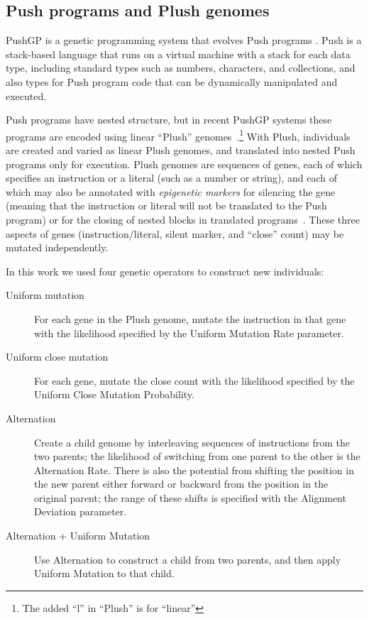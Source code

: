 \subsection{Push programs and Plush genomes}
\label{sec:PushGPBackground}

PushGP is a genetic programming system that evolves Push programs 
\cite{spector2:2001:gecco,spector:2002:GPEM,push3gecco,Helmuth:2015:dissertation}. 
Push is a stack-based language that runs on a virtual machine with a stack for 
each data type, including standard types such as numbers, characters, and 
collections, and also types for Push program code that can be dynamically 
manipulated and executed. 

Push programs have nested structure, but in recent PushGP systems these 
programs are encoded using linear ``Plush'' 
genomes~\cite{helmuthlinear}.\footnote{The added ``l'' in ``Plush'' 
	is for ``linear''}
With Plush, individuals are created and varied as linear Plush genomes, and 
translated into nested Push programs only for execution.
Plush genomes are sequences of genes, each of which specifies an instruction or 
a literal (such as a number or string), and each of which may also be annotated 
with {\it epigenetic markers} for silencing the gene (meaning that the instruction 
or literal will not be translated to the Push program) or for the closing of nested 
blocks in translated programs~\cite{la2015inheritable}. These three aspects of 
genes (instruction/literal, silent marker, and ``close'' count) may be mutated 
independently.

In this work we used four genetic operators to construct new individuals:
\begin{description}
	\item[Uniform mutation] For each gene in the Plush genome, mutate the 
	instruction in that gene with the likelihood specified by the Uniform Mutation 
	Rate parameter.
	\item[Uniform close mutation] For each gene, mutate the close count
	with the likelihood specified by the Uniform Close Mutation Probability.
	\item[Alternation] Create a child genome by interleaving sequences of instructions from the two parents; the likelihood of switching from one
	parent to the other is the Alternation Rate. There is also the potential from
	shifting the position in the new parent either forward or backward from
	the position in the original parent; the range of these shifts is specified
	with the Alignment Deviation parameter.
	\item[Alternation + Uniform Mutation] Use Alternation to construct a
	child from two parents, and then apply Uniform Mutation to that child.
\end{description}

